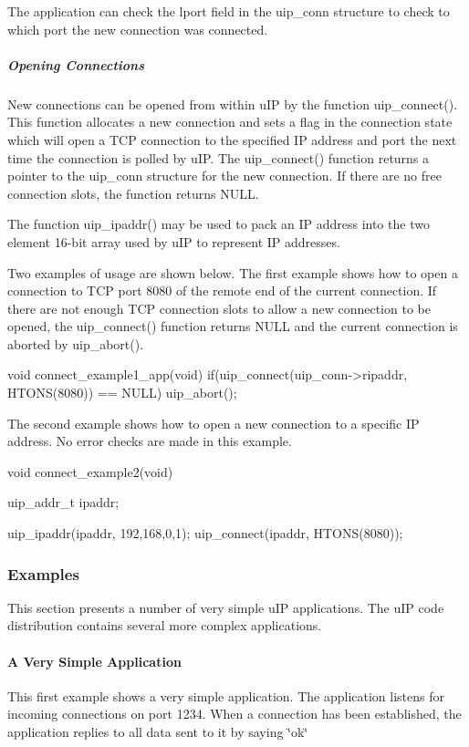 \-The application can check the lport field in the uip\-\_\-conn structure to check to which port the new connection was connected.\hypertarget{a00060_connect}{}\subparagraph{\-Opening Connections}\label{a00060_connect}
\-New connections can be opened from within u\-I\-P by the function uip\-\_\-connect(). \-This function allocates a new connection and sets a flag in the connection state which will open a \-T\-C\-P connection to the specified \-I\-P address and port the next time the connection is polled by u\-I\-P. \-The uip\-\_\-connect() function returns a pointer to the uip\-\_\-conn structure for the new connection. \-If there are no free connection slots, the function returns \-N\-U\-L\-L.

\-The function uip\-\_\-ipaddr() may be used to pack an \-I\-P address into the two element 16-\/bit array used by u\-I\-P to represent \-I\-P addresses.

\-Two examples of usage are shown below. \-The first example shows how to open a connection to \-T\-C\-P port 8080 of the remote end of the current connection. \-If there are not enough \-T\-C\-P connection slots to allow a new connection to be opened, the uip\-\_\-connect() function returns \-N\-U\-L\-L and the current connection is aborted by uip\-\_\-abort().


\begin{DoxyCode}
void connect_example1_app(void) {
   if(uip_connect(uip_conn->ripaddr, HTONS(8080)) == NULL) {
      uip_abort();
   }
}   
\end{DoxyCode}


\-The second example shows how to open a new connection to a specific \-I\-P address. \-No error checks are made in this example.


\begin{DoxyCode}
void connect_example2(void) {
   uip_addr_t ipaddr;

   uip_ipaddr(ipaddr, 192,168,0,1);
   uip_connect(ipaddr, HTONS(8080));
}
\end{DoxyCode}
\hypertarget{a00060_examples}{}\subsubsection{\-Examples}\label{a00060_examples}
\-This section presents a number of very simple u\-I\-P applications. \-The u\-I\-P code distribution contains several more complex applications.\hypertarget{a00060_example1}{}\paragraph{\-A Very Simple Application}\label{a00060_example1}
\-This first example shows a very simple application. \-The application listens for incoming connections on port 1234. \-When a connection has been established, the application replies to all data sent to it by saying \char`\"{}ok\char`\"{}

